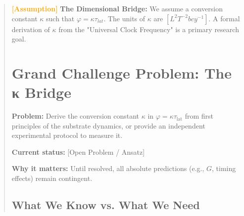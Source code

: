 \documentclass[11pt,titlepage]{article}
\newcommand{\tagass}{\textcolor{orange}{\textbf{[Assumption]}} }
\begin{document}
\begin{abstract}
\tagass \textbf{The Dimensional Bridge:} We assume a conversion constant $\kappa$ such that $\varphi = \kappa \tau_{lat}$. The units of $\kappa$ are $[L^2 T^{-2} b cy^{-1}]$. A formal derivation of $\kappa$ from the "Universal Clock Frequency" is a primary research goal.






\section{Grand Challenge Problem: The κ Bridge}
\label{sec:kappa-grand-challenge}

\begin{tcolorbox}[colback=red!5!white,colframe=red!75!black,title=Grand Challenge Problem \#1: Deriving κ]
\label{gcp:kappa}
\textbf{Problem:} Derive the conversion constant $\kappa$ in $\varphi = \kappa \tau_{\mathrm{lat}}$ from first principles of the substrate dynamics, or provide an independent experimental protocol to measure it.

\textbf{Current status:} [Open Problem / Ansatz]

\textbf{Why it matters:} Until resolved, all absolute predictions (e.g., $G$, timing effects) remain contingent.
\end{tcolorbox}

\subsection{What We Know vs. What We Need}


\end{abstract}
\end{document}
